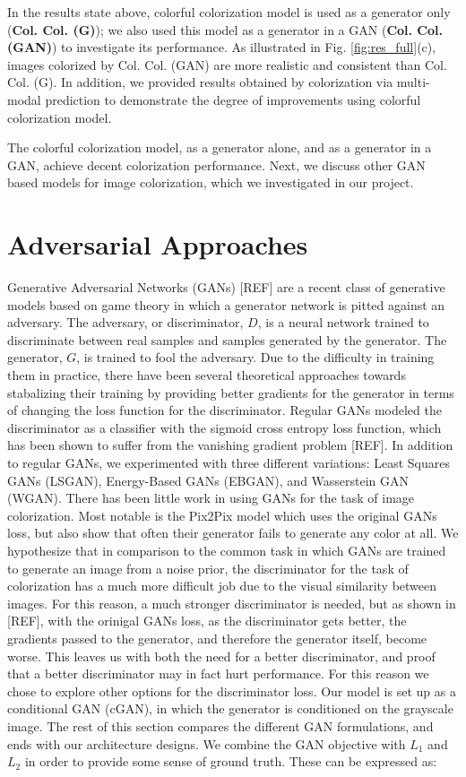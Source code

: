 \documentclass{article} %
\begin{document}
In the results state above, colorful colorization model is used as a generator only (\textbf{Col. Col. (G)}); we also used this model as a generator in a GAN (\textbf{Col. Col. (GAN)}) to investigate its performance. As illustrated in Fig. \ref{fig:res_full}(c), images colorized  by Col. Col. (GAN) are more realistic and consistent than Col. Col. (G). In addition, we provided results obtained by colorization via multi-modal prediction \cite{charpiat2008automatic} to demonstrate the degree of improvements using colorful colorization model. 

The colorful colorization model, as a generator alone, and as a generator in a GAN, achieve decent colorization performance. Next, we discuss other GAN based models for image colorization, which we investigated in our project. 

\section{Adversarial Approaches}
Generative Adversarial Networks (GANs) [REF] are a recent class of generative models based on game theory
in which a generator network is pitted against an adversary. The adversary, or discriminator, $D$, is a 
neural network trained to discriminate between real samples and samples generated by the generator. The
generator, $G$, is trained to fool the adversary. Due to the difficulty in
training them in practice, there have been several theoretical approaches towards stabalizing their training
by providing better gradients for the generator in terms of changing the loss function for the discriminator.
Regular GANs modeled the discriminator as a classifier with the sigmoid cross entropy loss function,
which has been shown to suffer from the vanishing gradient problem [REF]. In addition to regular GANs,
we experimented with three different variations: Least Squares GANs (LSGAN), Energy-Based GANs (EBGAN), and Wasserstein GAN
(WGAN). There has been little work in using GANs for the task of image colorization. Most notable is the
Pix2Pix model which uses the original GANs loss, but also show that often their generator fails to generate
any color at all. We hypothesize that in comparison to the common task in which GANs are trained to generate
an image from a noise prior, the discriminator for the task of colorization has a much more difficult job
due to the visual similarity between images. For this reason, a much stronger discriminator is needed, but
as shown in [REF], with the orinigal GANs loss, as the discriminator gets better, the gradients passed to the
generator, and therefore the generator itself, become worse. This leaves us with both the need for a better discriminator,
and proof that a better discriminator may in fact hurt performance. For this reason we chose to explore other
options for the discriminator loss. Our model is set up as a conditional GAN (cGAN), in which the
generator is conditioned on the grayscale image. The rest of this section compares the different GAN
formulations, and ends with our architecture designs. We combine the GAN objective with $L_1$ and $L_2$ in
order to provide some sense of ground truth. These can be expressed as:
\end{document}
